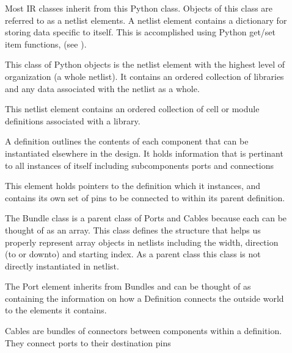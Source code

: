 \documentclass[letterpaper,10pt,english,openany,oneside]{sphinxmanual}
\begin{document}
\begin{description}
\item[{}] \leavevmode
Most IR classes inherit from this Python class. Objects of this class are referred to as a netlist elements. A netlist
element contains a dictionary for storing data specific to itself. This is accomplished using Python get/set item
functions, (see {\hyperref[\detokenize{reference/element_data:sec-element-data}]{}}).

\item[{}] \leavevmode
This class of Python objects is the netlist element with the highest level of organization (a whole netlist). It
contains an ordered collection of libraries and any data associated with the netlist as a whole.

\item[{}] \leavevmode
This netlist element contains an ordered collection of cell or module definitions associated with a library.

\item[{}] \leavevmode
A definition outlines the contents of each component that can be instantiated elsewhere in the design. It holds information that is pertinant to all instances of itself including subcomponents ports and connections

\item[{}] \leavevmode
This element holds pointers to the definition which it instances, and contains its own set of pins to be connected to within its parent definition.

\item[{}] \leavevmode
The Bundle class is a parent class of Ports and Cables because each can be thought of as an array. This class defines the structure that helps us properly represent array objects in netlists including the width, direction (to or downto) and starting index. As a parent class this class is not directly instantiated in netlist.

\item[{}] \leavevmode
The Port element inherits from Bundles and can be thought of as containing the information on how a Definition connects the outside world to the elements it contains.

\item[{}] \leavevmode
Cables are bundles of connectors between components within a definition. They connect ports to their destination pins


\end{description}
\end{document}
